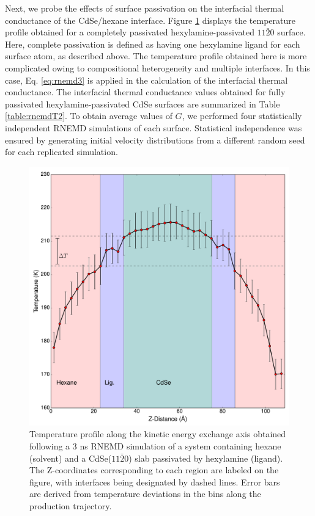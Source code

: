 Next, we probe the effects of surface passivation on the interfacial thermal conductance of the CdSe/hexane interface. Figure \ref{f:rnemd3} displays the temperature profile obtained for a completely passivated hexylamine-passivated $11\bar{2}0$ surface. Here, complete passivation is defined as having one hexylamine ligand for each surface atom, as described above. The temperature profile obtained here is more complicated owing to compositional heterogeneity and multiple interfaces. In this case, Eq. \ref{eq:rnemd3} is applied in the calculation of the interfacial thermal conductance. The interfacial thermal conductance values obtained for fully passivated hexylamine-passivated CdSe surfaces are summarized in Table \ref{table:rnemdT2}. To obtain average values of $G$, we performed four statistically independent RNEMD simulations of each surface. Statistical independence was ensured by generating initial velocity distributions from a different random seed for each replicated simulation. \par

\begin{figure}
\begin{center}
\includegraphics[width=\textwidth]{./Chapter4/rnemd3.pdf}
\caption[Temperature profile obtained from RNEMD simulation of CdSe/hexylamine/hexane interface.]{Temperature profile along the kinetic energy exchange axis obtained following a 3 ns RNEMD simulation of a system containing hexane (solvent) and a CdSe($11\bar{2}0$) slab passivated by hexylamine (ligand). The Z-coordinates corresponding to each region are labeled on the figure, with interfaces being designated by dashed lines. Error bars are derived from temperature deviations in the bins along the production trajectory.}
\label{f:rnemd3}
\end{center}
\end{figure}

